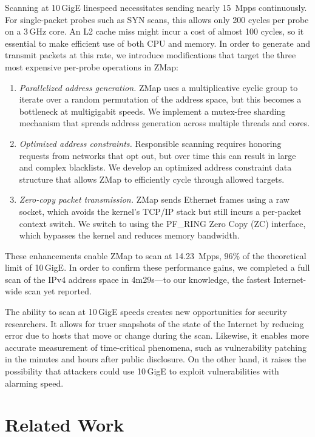 Scanning at 10\,GigE linespeed necessitates sending nearly 15~Mpps
continuously. For single-packet probes such as SYN scans, this allows only
200 cycles per probe on a 3\,GHz core. An L2 cache miss might incur a cost of
almost 100 cycles, so it essential to make efficient use of both CPU and
memory. In order to generate and transmit packets at this rate, we introduce
modifications that target the three most expensive per-probe operations in
ZMap:
\begin{enumerate}
  \item \emph{Parallelized address generation.}\quad
    ZMap uses a multiplicative cyclic group to iterate over a random permutation
    of the address space, but this becomes a bottleneck at multigigabit speeds.
    We implement a mutex-free sharding mechanism that spreads address generation
    across multiple threads and cores.
  \item \emph{Optimized address constraints.}\quad
    Responsible scanning requires honoring requests from networks that opt out,
    but over time this can result in large and complex blacklists. We develop an
    optimized address constraint data structure that allows ZMap to efficiently
    cycle through allowed targets.
  \item \emph{Zero-copy packet transmission.}\quad
    ZMap sends Ethernet frames using a raw socket, which avoids the kernel's
    TCP/IP stack but still incurs a per-packet context switch. We switch to using
    the PF\_RING Zero Copy (ZC) interface, which bypasses the kernel and reduces
    memory bandwidth.
\end{enumerate}

These enhancements enable ZMap to scan at 14.23~Mpps, 96\% of the theoretical
limit of 10\,GigE\@. In order to confirm these performance gains, we
completed a full scan of the IPv4 address space in 4m29s---to our knowledge,
the fastest Internet-wide scan yet reported.

The ability to scan at 10\,GigE speeds creates new opportunities for security
researchers. It allows for truer snapshots of the state of the Internet by
reducing error due to hosts that move or change during the scan. Likewise, it
enables more accurate measurement of time-critical phenomena, such as
vulnerability patching in the minutes and hours after public disclosure. On
the other hand, it raises the possibility that attackers could use 10\,GigE
to exploit vulnerabilities with alarming speed.

\section{Related Work}
\label{sec:relatedwork}

